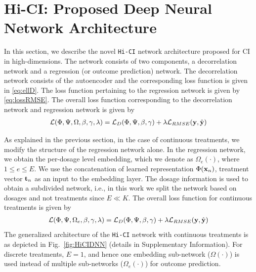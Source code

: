 \documentclass[twoside,11pt]{article}
\begin{document}
\section{Hi-CI: Proposed Deep Neural Network Architecture}
In this section, we describe the novel \texttt{Hi-CI} network architecture proposed for CI in high-dimensions. The network consists of two components, a decorrelation network and a regression (or outcome prediction) network. %
The decorrelation network consists of the autoencoder and the corresponding loss function is given in \eqref{eq:ellD}. The loss function pertaining to the regression network is given by \eqref{eq:lossRMSE}. The overall loss function corresponding to the decorrelation network and regression network is given by %
\begin{align}
    \mathcal{L}(\Phi,\Psi, \Omega, \beta , \gamma, \lambda) = \mathcal{L}_D(\Phi,\Psi,\beta,\gamma) 
     + \lambda \mathcal{L}_{RMSE}(\mathbf{y},\hat{\mathbf{y}})
\label{eq:overallLoss}
\end{align}

As explained in the previous section, in the case of continuous treatments, we modify the structure of the regression network alone. In the regression network, we obtain the per-dosage level embedding, which we denote as $\Omega_e(\cdot)$, where $1 \leq e \leq E$. We use the concatenation of learned representation $\Phi(\mathbf{x}_n)$, treatment vector $\mathbf{t}_n$ as an input to the embedding layer. The dosage information is used to obtain a subdivided network, i.e., in this work we split the network based on dosages and not treatments since $E \ll K$. The overall loss function for continuous treatments is given by %
\begin{align}
\mathcal{L}(\Phi, \Psi, \Omega_e, \beta,\gamma,\lambda) =  \mathcal{L}_D(\Phi,\Psi,\beta,\gamma) + \lambda\mathcal{L}_{RMSE}(\mathbf{y},\hat{\mathbf{y}})
\label{eq:overallLoss_dose}
\end{align}
The generalized architecture of the \texttt{Hi-CI} network with continuous treatments is as depicted in Fig.~\ref{fig:HiCIDNN} (details in Supplementary Information). For discrete treatments, $E = 1$, and hence one embedding sub-network ($\Omega(\cdot)$) is used instead of multiple sub-networks ($\Omega_e(\cdot)$) for outcome prediction.
\end{document}

